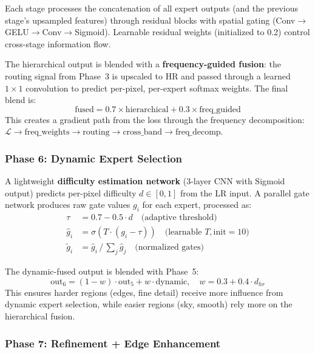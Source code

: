 \documentclass[10pt,twocolumn,letterpaper]{article}
\begin{document}
Each stage processes the concatenation of all expert outputs (and the previous stage's upsampled features) through residual blocks with spatial gating (Conv$\to$GELU$\to$Conv$\to$Sigmoid). Learnable residual weights (initialized to 0.2) control cross-stage information flow.

The hierarchical output is blended with a \textbf{frequency-guided fusion}: the routing signal from Phase~3 is upscaled to HR and passed through a learned $1\times 1$ convolution to predict per-pixel, per-expert softmax weights. The final blend is:
\begin{equation}
\text{fused} = 0.7 \times \text{hierarchical} + 0.3 \times \text{freq\_guided}
\end{equation}
This creates a gradient path from the loss through the frequency decomposition: $\mathcal{L} \to \text{freq\_weights} \to \text{routing} \to \text{cross\_band} \to \text{freq\_decomp}$.

\subsubsection{Phase 6: Dynamic Expert Selection}

A lightweight \textbf{difficulty estimation network} (3-layer CNN with Sigmoid output) predicts per-pixel difficulty $d \in [0,1]$ from the LR input. A parallel gate network produces raw gate values $g_i$ for each expert, processed as:
\begin{align}
\tau &= 0.7 - 0.5 \cdot d \quad \text{(adaptive threshold)} \\
\hat{g}_i &= \sigma\!\left(T \cdot (g_i - \tau)\right) \quad \text{(learnable } T, \text{init}=10\text{)} \\
\tilde{g}_i &= \hat{g}_i \,/\, {\textstyle\sum_j \hat{g}_j} \quad \text{(normalized gates)}
\end{align}

The dynamic-fused output is blended with Phase~5:
\begin{equation}
\text{out}_6 = (1 - w) \cdot \text{out}_5 + w \cdot \text{dynamic}, \quad w = 0.3 + 0.4 \cdot d_{hr}
\end{equation}
This ensures harder regions (edges, fine detail) receive more influence from dynamic expert selection, while easier regions (sky, smooth) rely more on the hierarchical fusion.

\subsubsection{Phase 7: Refinement + Edge Enhancement}
\end{document}
